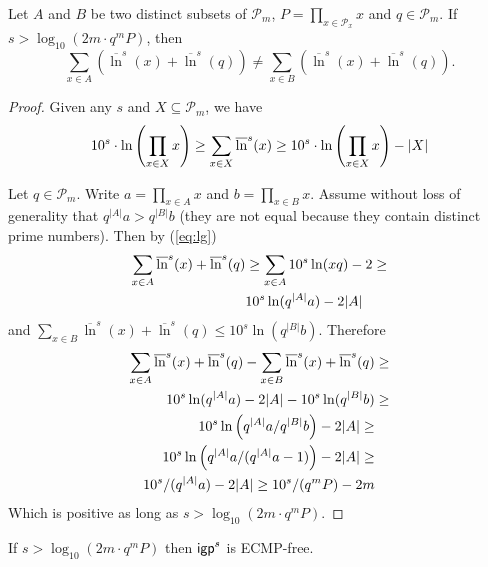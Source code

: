   
\begin{proposition}
\label{prop:converge}
Let $A$ and $B$ be two distinct subsets of $\mathcal{P}_m$, $P = \prod_{x \in \mathcal{P}_x} x$ and $q \in \mathcal{P}_m$. If $s > \log_{10} \left( 2 m \cdot q^m P \right)$, 
then 
$$
\sum_{x \in A} \left( \overline{\ln}^s(x) + \overline{\ln}^s(q) \right) \neq \sum_{x \in B} \left( \overline{\ln}^s(x) + \overline{\ln}^s(q) \right).
$$
\end{proposition}

\begin{proof}
Given any $s$ and $X \subseteq \mathcal{P}_m$, we have
\begin{equation}
\small
\label{eq:lg}
10^s \cdot \ln \left( \prod_{x \in X} x \right) \geq \sum_{x \in X} \overline{\ln}^s(x) \geq 10^s \cdot \ln \left( \prod_{x \in X} x \right) - |X|
\end{equation}

Let $q \in \mathcal{P}_m$. Write $a = \prod_{x \in A} x$ and $b = \prod_{x \in B} x$. Assume without loss of generality that $q^{|A|} a > q^{|B|} b$ (they are not equal because they contain distinct prime numbers). 
Then by (\ref{eq:lg})
\begin{align*}
\tiny
\sum_{x \in A} \overline{\ln}^s(x) +  \overline{\ln}^s(q) & \geq \sum_{x \in A} 10^s \ln(x q) - 2 \geq \\
& 10^s \ln(q^{|A|} a) - 2 |A|
\end{align*}
and $\sum_{x \in B} \overline{\ln}^s(x) + \overline{\ln}^s(q) \leq 10^s \ln (q^{|B|} b)$. Therefore
\begin{align*}
\tiny
\sum_{x \in A} \overline{\ln}^s(x) +  \overline{\ln}^s(q) - \sum_{x \in B} \overline{\ln}^s(x) + \overline{\ln}^s(q) & \geq \\
10^s \ln(q^{|A|} a) - 2 |A| - 10^s \ln (q^{|B|} b) & \geq \\
10^s  \ln \left(q^{|A|} a \slash q^{|B|} b \right) - 2 |A| \geq & \\
10^s  \ln \left(q^{|A|} a \slash (q^{|A|} a - 1) \right) - 2 |A| \geq & \\
10^s \slash (q^{|A|} a) - 2|A| \geq 10^s \slash (q^m P) - 2m
\end{align*}
Which is positive as long as $s > \log_{10} \left( 2 m \cdot q^m P \right)$.
\end{proof}

\begin{corollary}
If $s > \log_{10} \left( 2 m \cdot q^m P \right)$ then $\mathsf{igp}^s$ is ECMP-free.
\end{corollary}

